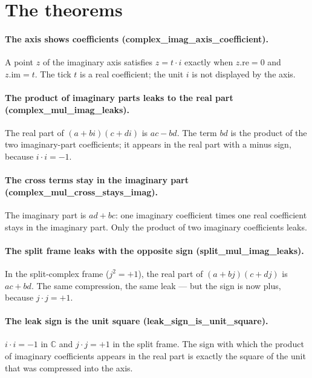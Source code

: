 \documentclass[sigplan,10pt,anonymous,review]{acmart}
\begin{document}
\section{The theorems}

\paragraph{The axis shows coefficients (complex\_imag\_axis\_coefficient).}
A point $z$ of the imaginary axis satisfies $z = t \cdot i$ exactly
when $z.\mathrm{re} = 0$ and $z.\mathrm{im} = t$. The tick $t$ is a
real coefficient; the unit $i$ is not displayed by the axis.

\paragraph{The product of imaginary parts leaks to the real part
(complex\_mul\_imag\_leaks).} The real part of $(a+bi)(c+di)$ is
$ac - bd$. The term $bd$ is the product of the two imaginary-part
coefficients; it appears in the real part with a minus sign, because
$i \cdot i = -1$.

\paragraph{The cross terms stay in the imaginary part
(complex\_mul\_cross\_stays\_imag).} The imaginary part is
$ad + bc$: one imaginary coefficient times one real coefficient stays
in the imaginary part. Only the product of two imaginary coefficients
leaks.

\paragraph{The split frame leaks with the opposite sign
(split\_mul\_imag\_leaks).} In the split-complex frame ($j^2 = +1$),
the real part of $(a+bj)(c+dj)$ is $ac + bd$. The same compression, the
same leak --- but the sign is now plus, because $j \cdot j = +1$.

\paragraph{The leak sign is the unit square
(leak\_sign\_is\_unit\_square).} $i \cdot i = -1$ in $\mathbb{C}$ and
$j \cdot j = +1$ in the split frame. The sign with which the product of
imaginary coefficients appears in the real part is exactly the square
of the unit that was compressed into the axis.
\end{document}
